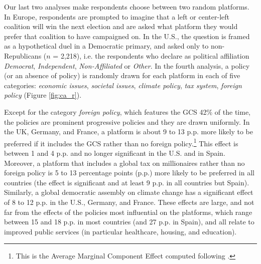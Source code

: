 \begin{stretchpars}
Our last two analyses  make respondents choose between two random platforms. In Europe, respondents are prompted to imagine that a left or center-left coalition will win the next election and are asked what platform they would prefer that coalition to have campaigned on. In the U.S., the question is framed as a hypothetical duel in a Democratic primary, and asked only to non-Republicans ($n$ = 2,218), i.e. the respondents who declare as political affiliation \textit{Democrat}, \textit{Independent}, \textit{Non-Affiliated} or \textit{Other}. In the fourth analysis, a policy (or an absence of policy) is randomly drawn for each platform in each of five categories: \textit{economic issues}, \textit{societal issues}, \textit{climate policy}, \textit{tax system}, \textit{foreign policy} (Figure \ref{fig:ca_r}). 

Except for the category \textit{foreign policy}, which features the GCS 42\% of the time, the policies are prominent progressive policies and they are drawn uniformly. %
In the UK, Germany, and France, a platform is about 9 to 13 p.p. more likely to be preferred if it includes the GCS rather than no foreign policy.\footnote{This is the Average Marginal Component Effect computed following \citet{hainmueller_causal_2014}.} This effect is between 1 and 4 p.p. and no longer significant in the U.S. and in Spain. Moreover, a platform that includes a global tax on millionaires rather than no foreign policy is 5 to 13 percentage points (p.p.) more likely to be preferred in all countries (the effect is significant and at least 9 p.p. in all countries but Spain). 
Similarly, a global democratic assembly on climate change has a significant effect of 8 to 12 p.p. in the U.S., Germany, and France. 
These effects are large, and not far from the effects of the policies most influential on the platforms, which range between 15 and 18 p.p. in most countries (and 27 p.p. in Spain), and all relate to improved public services (in particular healthcare, housing, and education).
\end{stretchpars}
 
